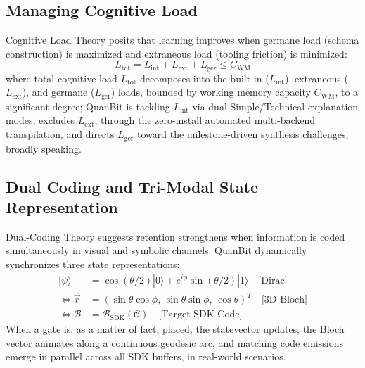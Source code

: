 \documentclass[conference]{IEEEtran}
\begin{document}
\subsection{Managing Cognitive Load}
Cognitive Load Theory posits that learning improves when germane load (schema construction) is maximized and extraneous load (tooling friction) is minimized:
\begin{equation}
L_{\text{tot}} = L_{\text{int}} + L_{\text{ext}} + L_{\text{ger}} \le C_{\text{WM}}
\end{equation}
where total cognitive load $L_{\text{tot}}$ decomposes into the built-in ($L_{\text{int}}$), extraneous ($L_{\text{ext}}$), and germane ($L_{\text{ger}}$) loads, bounded by working memory capacity $C_{\text{WM}}$, to a significant degree; QuanBit is tackling $L_{\text{int}}$ via dual Simple/Technical explanation modes, excludes $L_{\text{ext}}$, through the zero-install automated multi-backend transpilation, and directs $L_{\text{ger}}$ toward the milestone-driven synthesis challenges, broadly speaking.

\subsection{Dual Coding and Tri-Modal State Representation}
Dual-Coding Theory \cite{b12} suggests retention strengthens when information is coded simultaneously in visual and symbolic channels. QuanBit dynamically synchronizes three state representations:
\begin{equation}
\label{eq:dualcoding}
\begin{aligned}
|\psi\rangle &= \cos(\theta/2)|0\rangle + e^{i\phi}\sin(\theta/2)|1\rangle \quad \text{[Dirac]} \\
\iff \vec{r} &= (\sin\theta\cos\phi, \, \sin\theta\sin\phi, \, \cos\theta)^T \quad \text{[3D Bloch]} \\
\iff \mathcal{B} &= \mathcal{B}_{\text{SDK}}(\mathcal{C}) \quad \text{[Target SDK Code]}
\end{aligned}
\end{equation}
When a gate is, as a matter of fact, placed, the statevector updates, the Bloch vector animates along a continuous geodesic arc, and matching code emissions emerge in parallel across all SDK buffers, in real-world scenarios.
\end{document}
